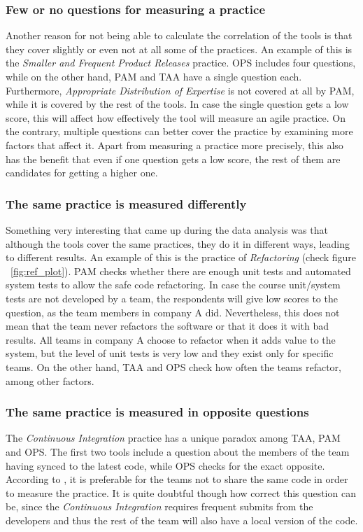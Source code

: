 \subsubsection{Few or no questions for measuring a practice}
Another reason for not being able to calculate the correlation of the tools is that they cover slightly or even not at all some of the practices. An example of this is the \textit{Smaller and Frequent Product Releases} practice. \ac{OPS} includes four questions, while on the other hand, \ac{PAM} and \ac{TAA} have a single question each. Furthermore, \textit{Appropriate Distribution of Expertise} is not covered at all by \ac{PAM}, while it is covered by the rest of the tools. In case the single question gets a low score, this will affect how effectively the tool will measure an agile practice. On the contrary, multiple questions can better cover the practice by examining more factors that affect it. Apart from measuring a practice more precisely, this also has the benefit that even if one question gets a low score, the rest of them are candidates for getting a higher one.

\subsubsection{The same practice is measured differently}
Something very interesting that came up during the data analysis was that although the tools cover the same practices, they do it in different ways, leading to different results. An example of this is the practice of \textit{Refactoring} (check figure ~\ref{fig:ref_plot}). \ac{PAM} checks whether there are enough unit tests and automated system tests to allow the safe code refactoring. In case the course unit/system tests are not developed by a team, the respondents will give low scores to the question, as the team members in company A did. Nevertheless, this does not mean that the team never refactors the software or that it does it with bad results. All teams in company A choose to refactor when it adds value to the system, but the level of unit tests is very low and they exist only for specific teams. On the other hand, \ac{TAA} and \ac{OPS} check how often the teams refactor, among other factors.

\subsubsection{The same practice is measured in opposite questions}
\label{subsec:opposite_questions}
The \textit{Continuous Integration} practice has a unique paradox among \ac{TAA}, \ac{PAM} and \ac{OPS}. The first two tools include a question about the members of the team having synced to the latest code, while \ac{OPS} checks for the exact opposite. According to \citet{sventha_dissertation}, it is preferable for the teams not to share the same code in order to measure the practice. It is quite doubtful though how correct this question can be, since the \textit{Continuous Integration} requires frequent submits from the developers and thus the rest of the team will also have a local version of the code.

